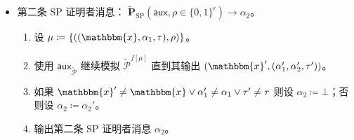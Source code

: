 \documentclass[american,singlepageview]{snargs-book-zh}
\newcommand{\Bits}{\{0,1\}}
\newcommand{\Malicious}[1]{\tilde{#1}}
\newcommand{\DefineEqual}{\coloneqq}
\newcommand{\AuxiliaryState}{\mathsf{aux}}
\newcommand{\Instance}{\mathbbm{x}}
\newcommand{\ProtoProver}{P}
\newcommand{\ProtoSalt}{\tau}
\newcommand{\ProtoRandomnessComplexity}{\mathsf{r}}
\newcommand{\SPSubscript}{\scriptscriptstyle\mathrm{SP}}
\newcommand{\SPFormat}[1]{\mathbf{#1}}
\newcommand{\SPMaliciousProver}{\Malicious{\SPFormat{\ProtoProver}}_{\SPSubscript}}
\newcommand{\SPCommitment}{\alpha_{1}}
\newcommand{\SPChallenge}{\rho}
\newcommand{\SPResponse}{\alpha_{2}}
\newcommand{\SPRandomnessComplexity}{\ProtoRandomnessComplexity}
\newcommand{\ARGFormat}[1]{\mathcal{#1}}
\newcommand{\ARGProver}{\ARGFormat{\ProtoProver}}
\newcommand{\ARGZKProgrammedList}{\ProgrammedList}
\newcommand{\ROFunction}{f}
\newcommand{\Lazy}[1]{\dot{#1}}
\newcommand{\ROProgram}[2]{#1[#2]}
\newcommand{\ProgrammedList}{\mu}
\newcommand{\RandSaltString}{\ProtoSalt}
\begin{document}
\begin{construction}
\begin{itemize}[noitemsep]
  \item 第二条 SP 证明者消息：
    \(\SPMaliciousProver(\AuxiliaryState, \SPChallenge\in\Bits^{\SPRandomnessComplexity}) \to \SPResponse\)。
  \begin{enumerate}[noitemsep]
    \item 设
      \(\ARGZKProgrammedList \DefineEqual \{((\Instance,\SPCommitment,\RandSaltString),\SPChallenge)\}\)。
    \item 使用
      \(\AuxiliaryState_{\Malicious{\ARGProver}}\)
      继续模拟
      \(\Malicious{\ARGProver}^{\ROProgram{\Lazy{\ROFunction}}{\ARGZKProgrammedList}}\)
      直到其输出
      \((\Instance',(\SPCommitment',\SPResponse',\RandSaltString'))\)。
    \item 如果
      \(\Instance' \neq \Instance \lor \SPCommitment' \neq \SPCommitment \lor \RandSaltString' \neq \RandSaltString\)
      则设 \(\SPResponse \DefineEqual \bot\)；否则设 \(\SPResponse \DefineEqual \SPResponse'\)。
    \item 输出第二条 SP 证明者消息 \(\SPResponse\)。
  \end{enumerate}
\end{itemize}
\end{construction}
\end{document}
